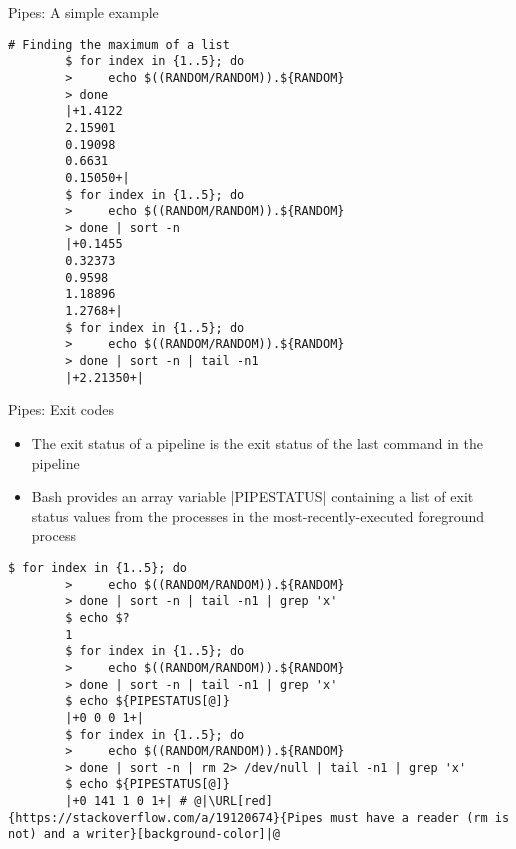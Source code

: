 \begin{frame}[fragile]{Pipes: A simple example}
    \vspace{-3mm}
    \begin{lstlisting}[style=MyBash]
        # Finding the maximum of a list
        $ for index in {1..5}; do
        >     echo $((RANDOM/RANDOM)).${RANDOM}
        > done
        |+1.4122
        2.15901
        0.19098
        0.6631
        0.15050+|
        $ for index in {1..5}; do
        >     echo $((RANDOM/RANDOM)).${RANDOM}
        > done | sort -n
        |+0.1455
        0.32373
        0.9598
        1.18896
        1.2768+|
        $ for index in {1..5}; do
        >     echo $((RANDOM/RANDOM)).${RANDOM}
        > done | sort -n | tail -n1
        |+2.21350+|
    \end{lstlisting}
\end{frame}
\begin{frame}[fragile]{Pipes: Exit codes}
    \vspace{-3mm}
    \begin{itemize}
        \item The exit status of a pipeline is the exit status of the last command in the pipeline
        \item Bash provides an array variable \bash|PIPESTATUS| containing a list of exit status values from the processes in the most-recently-executed foreground process
    \end{itemize}
    \begin{lstlisting}[style=MyBash, aboveskip=3mm]
        $ for index in {1..5}; do
        >     echo $((RANDOM/RANDOM)).${RANDOM}
        > done | sort -n | tail -n1 | grep 'x'
        $ echo $?
        1
        $ for index in {1..5}; do
        >     echo $((RANDOM/RANDOM)).${RANDOM}
        > done | sort -n | tail -n1 | grep 'x'
        $ echo ${PIPESTATUS[@]}
        |+0 0 0 1+|
        $ for index in {1..5}; do
        >     echo $((RANDOM/RANDOM)).${RANDOM}
        > done | sort -n | rm 2> /dev/null | tail -n1 | grep 'x'
        $ echo ${PIPESTATUS[@]}
        |+0 141 1 0 1+| # @|\URL[red]{https://stackoverflow.com/a/19120674}{Pipes must have a reader (rm is not) and a writer}[background-color]|@
    \end{lstlisting}
\end{frame}

